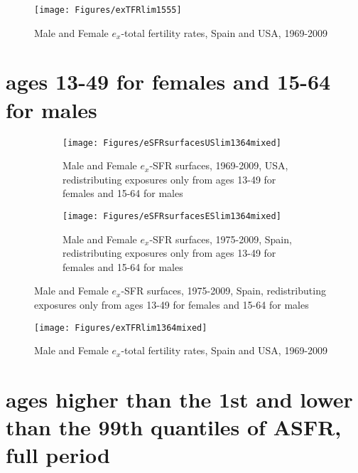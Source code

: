 \begin{figure}[ht!]
        \centering  
          \caption{Male and Female $e_x$-total fertility rates, Spain
          and USA, 1969-2009}
           \texttt{[image: Figures/exTFRlim1555]}
          \label{fig:exTFRlim15_55}
\end{figure}
\pagebreak

\section{ages 13-49 for females and 15-64 for males}

\begin{figure}[ht!]
        \centering
        \begin{subfigure}
                \centering
                \caption{Male and Female $e_x$-SFR surfaces, 1969-2009, USA,
                redistributing exposures only from ages 13-49 for females and 15-64 for males}
                \texttt{[image: Figures/eSFRsurfacesUSlim1364mixed]}
                \label{fig:exSFRsurfUSlim1364}
        \end{subfigure}
        \begin{subfigure}
                \centering
                \caption{Male and Female $e_x$-SFR surfaces, 1975-2009, Spain,
                redistributing exposures only from ages 13-49 for females and 15-64 for males}
                \texttt{[image: Figures/eSFRsurfacesESlim1364mixed]} 
                \label{fig:exSFRsurfESlim1364}
        \end{subfigure}
\end{figure}

\begin{figure}[ht!]
        \centering  
          \caption{Male and Female $e_x$-total fertility rates, Spain
          and USA, 1969-2009}
           \texttt{[image: Figures/exTFRlim1364mixed]}
          \label{fig:exTFRlim13_64}
\end{figure}

\pagebreak
\section{ages higher than the 1st and lower than the 99th quantiles of ASFR,
full period}

